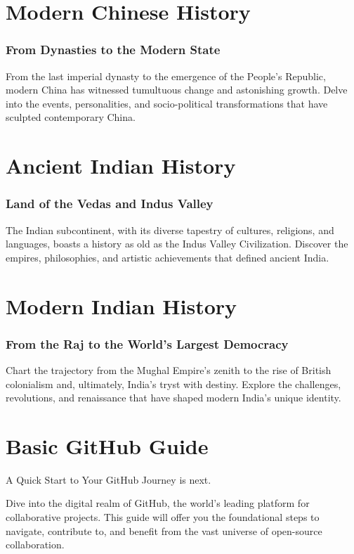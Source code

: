 \documentclass[a4paper,12pt]{book}
\begin{document}
\chapter{Modern Chinese History}
\subsection*{From Dynasties to the Modern State}
From the last imperial dynasty to the emergence of the People's Republic, modern China has witnessed tumultuous change and astonishing growth. Delve into the events, personalities, and socio-political transformations that have sculpted contemporary China.

\chapter{Ancient Indian History}
\subsection*{Land of the Vedas and Indus Valley}
The Indian subcontinent, with its diverse tapestry of cultures, religions, and languages, boasts a history as old as the Indus Valley Civilization. Discover the empires, philosophies, and artistic achievements that defined ancient India.

\chapter{Modern Indian History}
\subsection*{From the Raj to the World's Largest Democracy}
Chart the trajectory from the Mughal Empire's zenith to the rise of British colonialism and, ultimately, India's tryst with destiny. Explore the challenges, revolutions, and renaissance that have shaped modern India's unique identity.


\appendix
\chapter{Basic GitHub Guide}
A Quick Start to Your GitHub Journey is next.

Dive into the digital realm of GitHub, the world's leading platform for collaborative projects. This guide will offer you the foundational steps to navigate, contribute to, and benefit from the vast universe of open-source collaboration.
\end{document}
